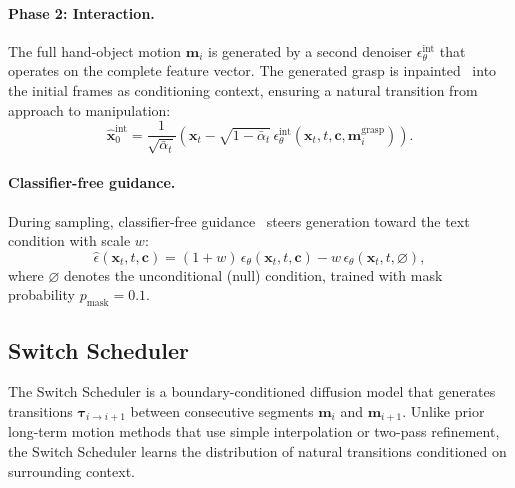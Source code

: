 \documentclass[runningheads]{llncs}
\newcommand{\bx}{\mathbf{x}}
\newcommand{\bc}{\mathbf{c}}
\newcommand{\bm}{\mathbf{m}}
\newcommand{\btau}{\boldsymbol{\tau}}
\begin{document}
\paragraph{Phase 2: Interaction.}
The full hand-object motion $\bm_i$ is generated by a second denoiser $\epsilon_\theta^\text{int}$ that operates on the complete feature vector.
The generated grasp is inpainted~\cite{lugmayr2022repaint} into the initial frames as conditioning context, ensuring a natural transition from approach to manipulation:
\begin{equation}
    \hat{\bx}_0^\text{int} = \frac{1}{\sqrt{\bar{\alpha}_t}}\left(\bx_t - \sqrt{1 - \bar{\alpha}_t}\, \epsilon_\theta^\text{int}(\bx_t, t, \bc, \bm_i^\text{grasp})\right).
    \label{eq:int_denoise}
\end{equation}

\paragraph{Classifier-free guidance.}
During sampling, classifier-free guidance~\cite{ho2022classifier} steers generation toward the text condition with scale $w$:
\begin{equation}
    \hat{\epsilon}({\bx}_t, t, \bc) = (1 + w)\, \epsilon_\theta(\bx_t, t, \bc) - w\, \epsilon_\theta(\bx_t, t, \varnothing),
    \label{eq:cfg}
\end{equation}
where $\varnothing$ denotes the unconditional (null) condition, trained with mask probability $p_\text{mask} = 0.1$.


\subsection{Switch Scheduler}
\label{sec:switch_scheduler}

The Switch Scheduler is a boundary-conditioned diffusion model that generates transitions $\btau_{i \rightarrow i{+}1}$ between consecutive segments $\bm_i$ and $\bm_{i{+}1}$.
Unlike prior long-term motion methods that use simple interpolation or two-pass refinement, the Switch Scheduler learns the distribution of natural transitions conditioned on surrounding context.
\end{document}
